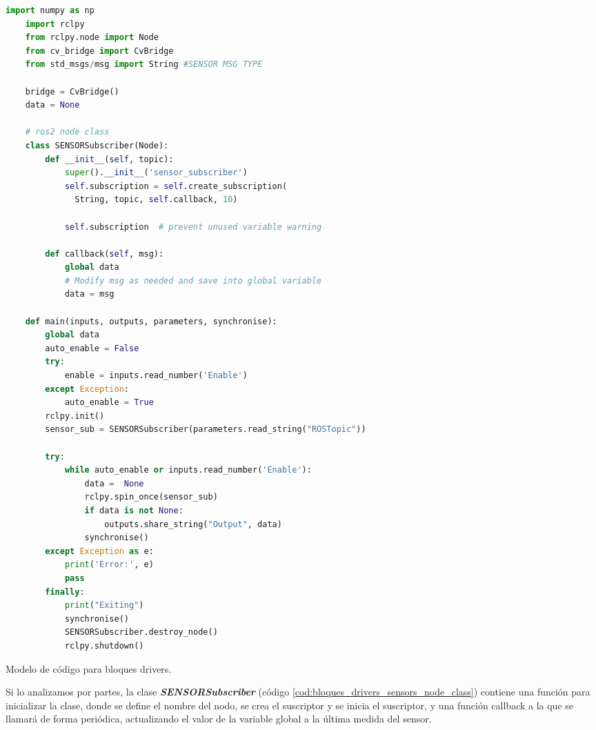 \begin{code}[H]
  \begin{lstlisting}[language=python]
    import numpy as np
    import rclpy
    from rclpy.node import Node
    from cv_bridge import CvBridge
    from std_msgs/msg import String #SENSOR MSG TYPE
    
    bridge = CvBridge()
    data = None
    
    # ros2 node class
    class SENSORSubscriber(Node):
        def __init__(self, topic):
            super().__init__('sensor_subscriber')
            self.subscription = self.create_subscription(
              String, topic, self.callback, 10)

            self.subscription  # prevent unused variable warning
    
        def callback(self, msg):
            global data
            # Modify msg as needed and save into global variable
            data = msg

    def main(inputs, outputs, parameters, synchronise):
        global data
        auto_enable = False
        try:
            enable = inputs.read_number('Enable')
        except Exception:
            auto_enable = True
        rclpy.init()
        sensor_sub = SENSORSubscriber(parameters.read_string("ROSTopic"))

        try:
            while auto_enable or inputs.read_number('Enable'):
                data =  None
                rclpy.spin_once(sensor_sub)
                if data is not None:
                    outputs.share_string("Output", data)
                synchronise()
        except Exception as e:
            print('Error:', e)
            pass
        finally:
            print("Exiting")
            synchronise()     
            SENSORSubscriber.destroy_node()
            rclpy.shutdown()
  \end{lstlisting}
  \caption[Modelo de código para bloques drivers]{Modelo de código para bloques drivers.}
  \label{cod:bloques_drivers_sensors_total}
\end{code}

Si lo analizamos por partes, la clase \textbf{\textit{SENSORSubscriber}} (código \ref{cod:bloques_drivers_sensors_node_class}) contiene una función para inicializar la clase, donde se define el nombre del nodo, se crea el suscriptor y se inicia el suscriptor, y una función callback a la que se llamará de forma periódica, actualizando el valor de la variable global a la última medida del sensor.

